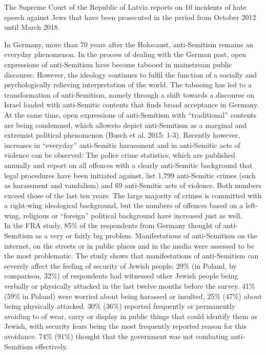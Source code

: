 The Supreme Court of the Republic of Latvia reports on 10 incidents of hate speech against Jews that have been prosecuted in the period from October 2012 until March 2018. \par
In Germany, more than 70 years after the Holocaust, anti-Semitism remains an everyday phenomenon. In the process of dealing with the German past, open expressions of anti-Semitism have become tabooed in mainstream public discourse. However, the ideology continues to fulfil the function of a socially and psychologically relieving interpretation of the world. The tabooing has led to a transformation of anti-Semitism, namely through a shift towards a discourse on Israel loaded with anti-Semitic contents that finds broad acceptance in Germany. At the same time, open expressions of anti-Semitism with ``traditional'' contents are being condemned, which allowsto depict anti-Semitism as a marginal and extremist political phenomenon (Busch et al. 2015: 1-3). Recently however, increases in ``everyday'' anti-Semitic harassment and in anti-Semitic acts of violence can be observed: The police crime statistics, which are published annually and report on all offences with a clearly anti-Semitic background that legal procedures have been initiated against, list 1,799 anti-Semitic crimes (such as harassment and vandalism) and 69 anti-Semitic acts of violence. Both numbers exceed those of the last ten years. The large majority of crimes is committed with a right-wing ideological background, but the numbers of offences based on a left-wing, religious or ``foreign'' political background have increased just as well. \\
In the FRA study, 85\% of the respondents from Germany thought of anti-Semitism as a very or fairly big problem. Manifestations of anti-Semitism on the internet, on the streets or in public places and in the media were assessed to be the most problematic. The study shows that manifestations of anti-Semitism can severely affect the feeling of security of Jewish people: 29\% (in Poland, by comparison, 32\%) of respondents had witnessed other Jewish people being verbally or physically attacked in the last twelve months before the survey. 41\% (59\% in Poland) were worried about being harassed or insulted, 25\% (47\%) about being physically attacked. 30\% (36\%) reported frequently or permanently avoiding to of wear, carry or display in public things that could identify them as Jewish, with security fears being the most frequently reported reason for this avoidance. 74\% (91\%) thought that the government was not combating anti-Semitism effectively.\\  
